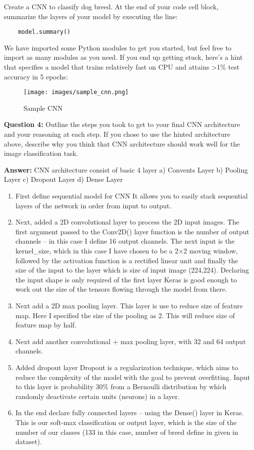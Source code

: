 \documentclass[11pt]{article}
\makeatletter
\def\maxwidth{\ifdim\Gin@nat@width>\linewidth\linewidth
    \else\Gin@nat@width\fi}
\let\Oldincludegraphics\includegraphics
\renewcommand{\includegraphics}[1]{\Oldincludegraphics[width=.8\maxwidth]{#1}}
\providecommand{\tightlist}{%
      \setlength{\itemsep}{0pt}\setlength{\parskip}{0pt}}
\makeatother
\begin{document}
Create a CNN to classify dog breed. At the end of your code cell block,
summarize the layers of your model by executing the line:

\begin{verbatim}
    model.summary()
\end{verbatim}

We have imported some Python modules to get you started, but feel free
to import as many modules as you need. If you end up getting stuck,
here's a hint that specifies a model that trains relatively fast on CPU
and attains \textgreater{}1\% test accuracy in 5 epochs:

\begin{figure}
\centering
\texttt{[image: images/sample\_cnn.png]}
\caption{Sample CNN}
\end{figure}

\textbf{Question 4:} Outline the steps you took to get to your final CNN
architecture and your reasoning at each step. If you chose to use the
hinted architecture above, describe why you think that CNN architecture
should work well for the image classification task.

\textbf{Answer:} CNN architecture consist of basic 4 layer a) Convents
Layer b) Pooling Layer c) Dropout Layer d) Dense Layer

\begin{enumerate}
\def\labelenumi{\arabic{enumi})}
\tightlist
\item
  First define sequential model for CNN It allows you to easily stack
  sequential layers of the network in order from input to output.
\item
  Next, added a 2D convolutional layer to process the 2D input images.
  The first argument passed to the Conv2D() layer function is the number
  of output channels -- in this case I define 16 output channels. The
  next input is the kernel\_size, which in this case I have chosen to be
  a 2×2 moving window, followed by the activation function is a
  rectified linear unit and finally the size of the input to the layer
  which is size of input image (224,224). Declaring the input shape is
  only required of the first layer Keras is good enough to work out the
  size of the tensors flowing through the model from there.
\item
  Next add a 2D max pooling layer. This layer is use to reduce size of
  feature map. Here I specified the size of the pooling as 2. This will
  reduce size of feature map by half.
\item
  Next add another convolutional + max pooling layer, with 32 and 64
  output channels.
\item
  Added dropout layer Dropout is a regularization technique, which aims
  to reduce the complexity of the model with the goal to prevent
  overfitting. Input to this layer is probability 30\% from a Bernoulli
  distribution by which randomly deactivate certain units (neurons) in a
  layer.
\item
  In the end declare fully connected layers -- using the Dense() layer
  in Keras. This is our soft-max classification or output layer, which
  is the size of the number of our classes (133 in this case, number of
  breed define in given in dataset).
\end{enumerate}
\end{document}

